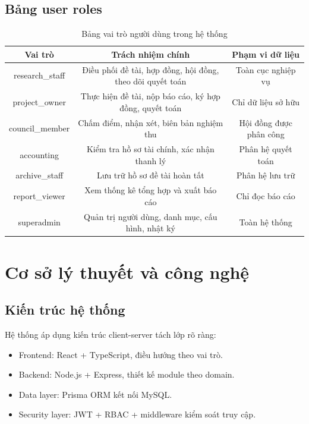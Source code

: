 \documentclass[12pt,a4paper]{report}
\begin{document}
\section{Bảng user roles}
\begin{table}[H]
\centering
\begin{tabular}{|c|c|c|}
\hline
\textbf{Vai trò} & \textbf{Trách nhiệm chính} & \textbf{Phạm vi dữ liệu} \\ \hline
research\_staff & Điều phối đề tài, hợp đồng, hội đồng, theo dõi quyết toán & Toàn cục nghiệp vụ \\ \hline
project\_owner & Thực hiện đề tài, nộp báo cáo, ký hợp đồng, quyết toán & Chỉ dữ liệu sở hữu \\ \hline
council\_member & Chấm điểm, nhận xét, biên bản nghiệm thu & Hội đồng được phân công \\ \hline
accounting & Kiểm tra hồ sơ tài chính, xác nhận thanh lý & Phân hệ quyết toán \\ \hline
archive\_staff & Lưu trữ hồ sơ đề tài hoàn tất & Phân hệ lưu trữ \\ \hline
report\_viewer & Xem thống kê tổng hợp và xuất báo cáo & Chỉ đọc báo cáo \\ \hline
superadmin & Quản trị người dùng, danh mục, cấu hình, nhật ký & Toàn hệ thống \\ \hline
\end{tabular}
\caption{Bảng vai trò người dùng trong hệ thống}
\end{table}

\chapter{Cơ sở lý thuyết và công nghệ}
\section{Kiến trúc hệ thống}
Hệ thống áp dụng kiến trúc client-server tách lớp rõ ràng:
\begin{itemize}[leftmargin=1.2cm]
\item Frontend: React + TypeScript, điều hướng theo vai trò.
\item Backend: Node.js + Express, thiết kế module theo domain.
\item Data layer: Prisma ORM kết nối MySQL.
\item Security layer: JWT + RBAC + middleware kiểm soát truy cập.
\end{itemize}
\end{document}
